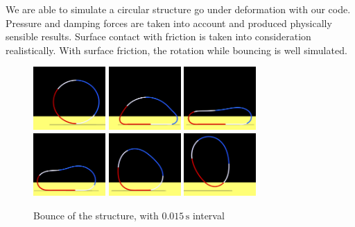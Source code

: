\documentclass[letterpaper,9pt,twocolumn]{extarticle}
\begin{document}
	We are able to simulate a circular structure go under deformation with our code. Pressure and damping forces are taken into account and produced physically sensible results. Surface contact with friction is taken into consideration realistically. With surface friction, the rotation while bouncing is well simulated.
	\begin{figure}[ht]
		\centering
		\includegraphics[width=2.75cm]{res/c-0105.png}%
		\includegraphics[width=2.75cm]{res/c-0120.png}%
		\includegraphics[width=2.75cm]{res/c-0135.png}\\
		\includegraphics[width=2.75cm]{res/c-0150.png}%
		\includegraphics[width=2.75cm]{res/c-0165.png}%
		\includegraphics[width=2.75cm]{res/c-0180.png}\\
		\caption{Bounce of the structure, with $0.015\,\mathrm s$ interval}
	\end{figure}
\end{document}
